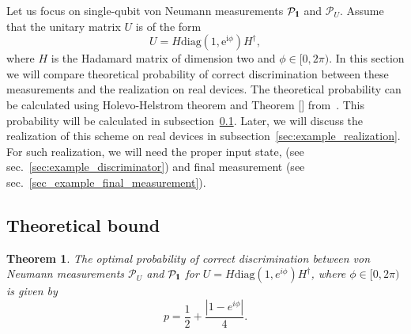 \documentclass[preprint,12pt, a4paper]{elsarticle}
\newcommand{\1}{{\rm 1\hspace{-0.9mm}l}}
\newcommand{\Id}{{\rm 1\hspace{-0.9mm}l}}
\newcommand{\ee}{\ensuremath{\mathrm{e}}}
\newcommand{\ii}{\ensuremath{\mathrm{i}}}
\newcommand{\PP}{\mathcal{P}}
\newcommand{\diag}{\mathrm{diag}}
\newtheorem{theorem}{Theorem}
\begin{document}
Let us focus on single-qubit von Neumann measurements $\PP_\1$ and $\PP_U$.
Assume that the unitary matrix $U$ is of the form 
\begin{equation}
U = H \diag (1, \ee^{\ii \phi}) H^\dagger,
\end{equation}
where $H$ is the Hadamard matrix of dimension two and $\phi \in [0, 2 \pi)$.
In this section we will compare theoretical probability of correct 
discrimination between these measurements and the realization on real devices.
The theoretical probability can be calculated using Holevo-Helstrom theorem and 
Theorem [] from~\cite{puchala2018strategies}. 
This probability will be calculated in 
subsection~\ref{sec:example_theoretical_probability}. Later, we will 
discuss the realization of this scheme on real devices in 
subsection~\ref{sec:example_realization}. For such realization, we 
will need the proper input state, (see sec.~\ref{sec:example_discriminator}) 
and final measurement (see sec.~\ref{sec_example_final_measurement}). 

\subsection{Theoretical bound}\label{sec:example_theoretical_probability}

\begin{theorem}
The optimal probability of correct discrimination between von Neumann
measurements $\PP_U$ and $\PP_{\Id}$ for $U = H \diag(1, e^{i \phi}) H^\dagger$,
where $\phi \in [0, 2\pi)$ is given by
\begin{equation}
p = \frac{1}{2} + \frac{|1 - e^{i \phi}  |}{4} . 
\end{equation}
\end{theorem}
\end{document}
